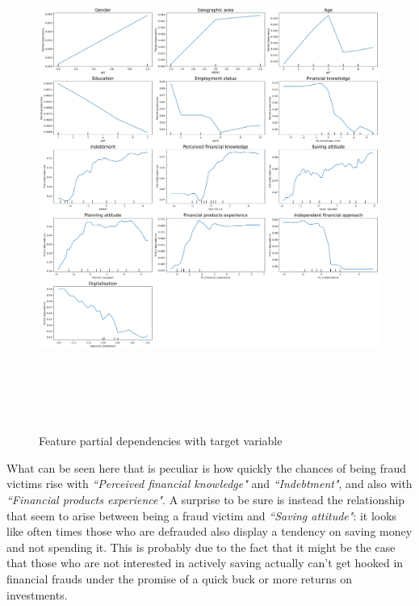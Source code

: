 \documentclass[a4paper,11pt]{article}
\begin{document}
\begin{figure}[H]
  \centering
        \includegraphics[height=16.5cm]{PartialDependences.png}
 \caption{Feature partial dependencies with target variable}
 \label{partialdep}
\end{figure}

What can be seen here that is peculiar is how quickly the chances of being fraud victims rise with \textit{``Perceived financial knowledge"} and \textit{``Indebtment"}, and also with \textit{``Financial products experience"}. A surprise to be sure is instead the relationship that seem to arise between being a fraud victim and \textit{``Saving attitude"}: it looks like often times those who are defrauded also display a tendency on saving money and not spending it. This is probably due to the fact that it might be the case that those who are not interested in actively saving actually can't get hooked in financial frauds under the promise of a quick buck or more returns on investments. 
\end{document}
